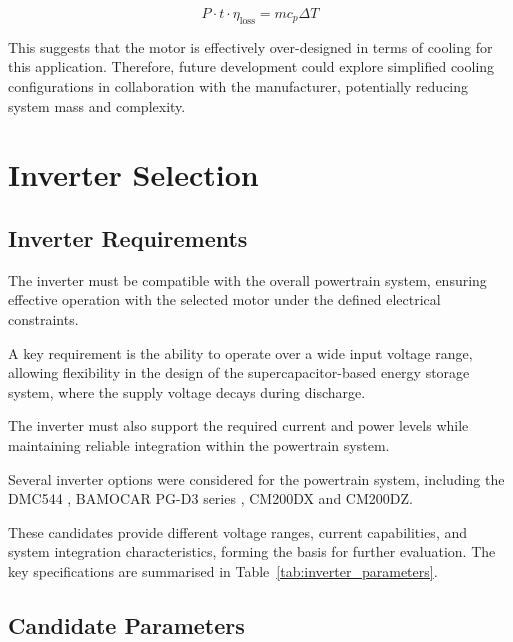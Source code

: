 \documentclass[11pt, a4paper]{report}
\numberwithin{equation}{section}
\begin{document}
\begin{equation}
P \cdot t \cdot \eta_{\text{loss}} = m c_p \Delta T
\end{equation}

This suggests that the motor is effectively over-designed in terms of cooling for this application. Therefore, future development could explore simplified cooling configurations in collaboration with the manufacturer, potentially reducing system mass and complexity.


\section{Inverter Selection}

\subsection{Inverter Requirements}

The inverter must be compatible with the overall powertrain system, ensuring effective operation with the selected motor under the defined electrical constraints.

A key requirement is the ability to operate over a wide input voltage range, allowing flexibility in the design of the supercapacitor-based energy storage system, where the supply voltage decays during discharge.

The inverter must also support the required current and power levels while maintaining reliable integration within the powertrain system.

Several inverter options were considered for the powertrain system, including the DMC544\cite{DMC544_datasheet}
, BAMOCAR PG-D3 series\cite{BAMOCAR_data_sheet}
, CM200DX and CM200DZ\cite{CM200_data_sheet}.

These candidates provide different voltage ranges, current capabilities, and system integration characteristics, forming the basis for further evaluation. The key specifications are summarised in Table~\ref{tab:inverter_parameters}.

\subsection{Candidate Parameters}
\end{document}
